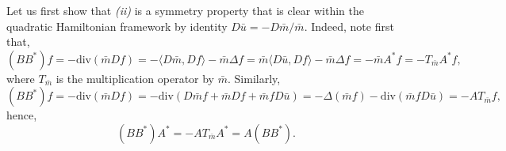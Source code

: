 \documentclass[10pt,a4paper,nouppercase,nowrite]{article}
\numberwithin{equation}{section}
\theoremstyle{definition}
\begin{document}
	Let us first show that \textit{(ii)} is a symmetry property that is clear within the quadratic Hamiltonian framework by identity $D \bar u = - D \bar m / \bar m$. Indeed, %
	note first that,
	\begin{equation*}
		(BB^{*}) f = - \text{div}(\bar{m}Df) = -\langle D\bar{m},Df \rangle -\bar{m} \Delta f =  \bar{m} \langle D\bar{u},Df \rangle - \bar{m} \Delta f = -\bar{m} A^{*} f = -T_{\bar{m}} A^{*} f,
	\end{equation*}
	where $T_{\bar{m}}$ is the multiplication operator by $\bar{m}$. Similarly,
	\begin{equation}\label{bbking}
		(BB^{*}) f = - \text{div}(\bar{m}Df) =- \text{div}(D \bar m f + \bar{m}Df + \bar m f D \bar u) = - \Delta(\bar m f)- \text{div}( \bar m f D \bar u) =  -A T_{\bar{m}}  f,
	\end{equation}
	hence,
	\[
	(BB^{*}) A^* = - A T_{\bar{m}} A^* = A (BB^{*}).
	\]
	
\end{document}

